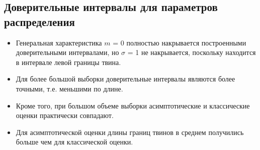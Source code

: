 \documentclass[main.tex]{subfiles}
\begin{document}
\subsection{Доверительные интервалы для параметров распределения}
\begin{itemize}
	\item Генеральная характеристика $m$ = 0 полностью накрывается построенными доверительными интервалами, но $\sigma$ = 1 не накрывается, поскольку находится в интервале левой границы твина.
	\item Для более большой выборки доверительные интервалы являются более точными, т.е. меньшими по длине.
	\item Кроме того, при большом объеме выборки асимптотические и классические оценки практически совпадают.
	\item Для асимптотической оценки длины границ твинов в среднем получились больше чем для классической оценки.
\end{itemize}

\newpage
\end{document}
